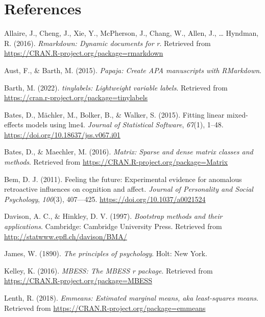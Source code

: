 \documentclass[
  man,floatsintext]{apa6}
\newlength{\cslentryspacing}
\begin{document}
\section{References}\label{references}

\setlength{\parindent}{-0.5in}
\setlength{\leftskip}{0.5in}

\label{refs}
\setlength{\cslentryspacing}{0em}
\begin{CSLReferences}
Allaire, J., Cheng, J., Xie, Y., McPherson, J., Chang, W., Allen, J., \ldots{} Hyndman, R. (2016). \emph{Rmarkdown: Dynamic documents for r}. Retrieved from \url{https://CRAN.R-project.org/package=rmarkdown}

Aust, F., \& Barth, M. (2015). \emph{Papaja: Create APA manuscripts with RMarkdown}.

Barth, M. (2022). \emph{{tinylabels}: Lightweight variable labels}. Retrieved from \url{https://cran.r-project.org/package=tinylabels}

Bates, D., Mächler, M., Bolker, B., \& Walker, S. (2015). Fitting linear mixed-effects models using {lme4}. \emph{Journal of Statistical Software}, \emph{67}(1), 1--48. \url{https://doi.org/10.18637/jss.v067.i01}

Bates, D., \& Maechler, M. (2016). \emph{Matrix: Sparse and dense matrix classes and methods}. Retrieved from \url{https://CRAN.R-project.org/package=Matrix}

Bem, D. J. (2011). Feeling the future: Experimental evidence for anomalous retroactive influences on cognition and affect. \emph{Journal of Personality and Social Psychology}, \emph{100}(3), 407---425. \url{https://doi.org/10.1037/a0021524}

Davison, A. C., \& Hinkley, D. V. (1997). \emph{Bootstrap methods and their applications}. Cambridge: Cambridge University Press. Retrieved from \url{http://statwww.epfl.ch/davison/BMA/}

James, W. (1890). \emph{The principles of psychology}. Holt: New York.

Kelley, K. (2016). \emph{MBESS: The MBESS r package}. Retrieved from \url{https://CRAN.R-project.org/package=MBESS}

Lenth, R. (2018). \emph{Emmeans: Estimated marginal means, aka least-squares means}. Retrieved from \url{https://CRAN.R-project.org/package=emmeans}


\end{CSLReferences}
\end{document}
